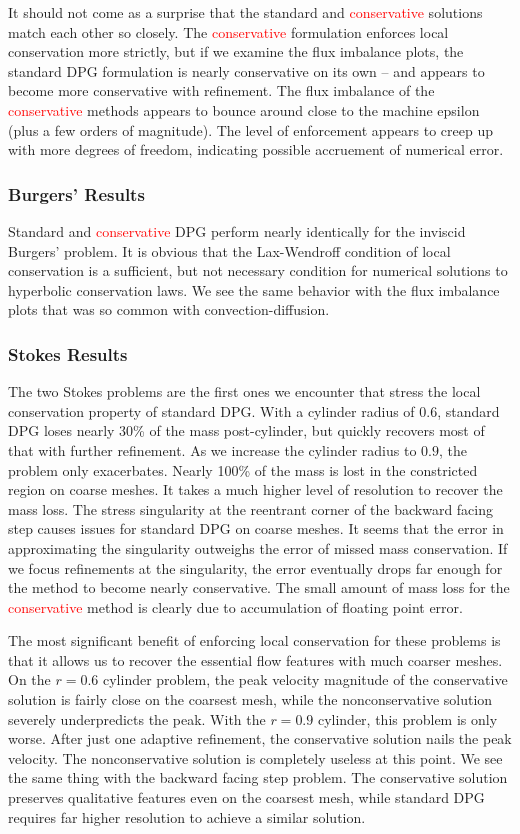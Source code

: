 \documentclass[letterpaper]{article}
\newcommand{\red}[1]{\textcolor{red}{#1}}
\begin{document}
It should not come as a surprise that the standard and \red{conservative}
solutions match each other so closely. The \red{conservative} formulation
enforces local conservation more strictly, but if we examine the flux
imbalance plots, the standard DPG formulation is nearly conservative on its
own -- and appears to become more conservative with refinement. The flux
imbalance of the \red{conservative} methods appears to bounce around close to the
machine epsilon (plus a few orders of magnitude). The level of enforcement
appears to creep up with more degrees of freedom, indicating possible
accruement of numerical error.

\subsubsection{Burgers' Results}
Standard and \red{conservative} DPG perform nearly identically for the
inviscid Burgers' problem. It is obvious that the Lax-Wendroff condition of
local conservation is a sufficient, but not necessary condition for numerical
solutions to hyperbolic conservation laws. We see the same behavior with the
flux imbalance plots that was so common with convection-diffusion.

\subsubsection{Stokes Results}
The two Stokes problems are the first ones we encounter that stress the local
conservation property of standard DPG. With a cylinder radius of $0.6$,
standard DPG loses nearly 30\% of the mass post-cylinder, but quickly recovers
most of that with further refinement. As we increase the cylinder radius to
$0.9$, the problem only exacerbates. Nearly 100\% of the mass is lost in the
constricted region on coarse meshes. It takes a much higher level of
resolution to recover the mass loss. The stress singularity at the reentrant
corner of the backward facing step causes issues for standard DPG on coarse
meshes. It seems that the error in approximating the singularity outweighs the
error of missed mass conservation. If we focus refinements at the singularity,
the error eventually drops far enough for the method to become nearly
conservative.
The small amount of mass loss for the \red{conservative} method is clearly due to
accumulation of floating point error.

The most significant benefit of enforcing local conservation for these
problems is that it allows us to recover the essential flow features with much
coarser meshes. On the $r=0.6$ cylinder problem, the peak velocity magnitude
of the conservative solution is fairly close on the coarsest mesh, while the
nonconservative solution severely underpredicts the peak. With the $r=0.9$
cylinder, this problem is only worse. After just one adaptive
refinement, the conservative solution nails the peak velocity. The
nonconservative solution is completely useless at this point. We see the same
thing with the backward facing step problem. The conservative solution preserves
qualitative features even on the coarsest mesh, while standard DPG requires far higher resolution
to achieve a similar solution. 
\end{document}
